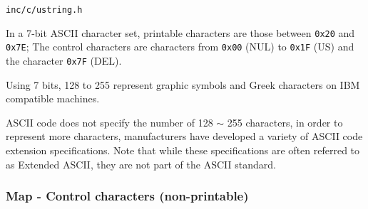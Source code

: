 
 \verb|inc/c/ustring.h|

In a 7-bit ASCII character set, printable characters are those between \verb`0x20` and \verb`0x7E`; The control characters are characters from \verb`0x00` (NUL) to \verb`0x1F` (US) and the character \verb`0x7F` (DEL).

Using 7 bits, 128 to 255 represent graphic symbols and Greek characters on IBM compatible machines.

ASCII code does not specify the number of 128 $\sim$ 255 characters, in order to represent more characters, manufacturers have developed a variety of ASCII code extension specifications. Note that while these specifications are often referred to as Extended ASCII, they are not part of the ASCII standard.

\subsubsection{Map - Control characters (non-printable)}


